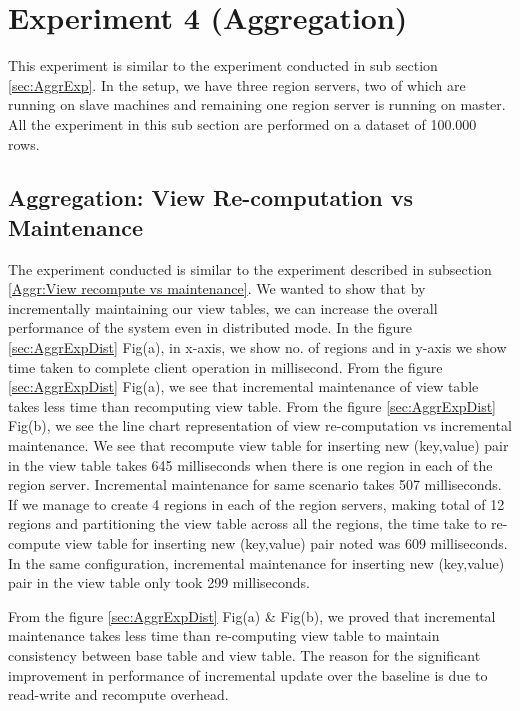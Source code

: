 \documentclass[11pt,a4paper,bibtotoc,idxtotoc,headsepline,footsepline,footexclude,BCOR12mm,DIV13]{scrbook}
\begin{document}
\section{Experiment 4 (Aggregation)}
\label{(sec:AggrExpDist)}

This experiment is similar to the experiment conducted in sub section \ref{sec:AggrExp}. In the setup, we have three region servers, two of which are running on slave machines and remaining one region server is running on master. All the experiment in this sub section are performed on a dataset of 100.000 rows.

\subsection{Aggregation: View Re-computation vs Maintenance}

The experiment conducted is similar to the experiment described in subsection \ref{Aggr:View recompute vs maintenance}. We wanted to show that by incrementally maintaining our view tables, we can increase the overall performance of the system even in distributed mode. In the figure \ref{sec:AggrExpDist} Fig(a), in x-axis, we show no. of regions and in y-axis we show time taken to complete client operation in millisecond. From the figure \ref{sec:AggrExpDist} Fig(a), we see that incremental maintenance of view table takes less time than recomputing view table. From the figure \ref{sec:AggrExpDist} Fig(b), we see the line chart representation of view re-computation vs incremental maintenance. We see that recompute view table for inserting new (key,value) pair in the view table takes 645 milliseconds when there is one region in each of the region server. Incremental maintenance for same scenario takes 507 milliseconds. If we manage to create 4 regions in each of the region servers, making total of 12 regions and partitioning the view table across all the regions, the time take to re-compute view table for inserting new (key,value) pair noted was 609 milliseconds. In the same configuration, incremental maintenance for inserting new (key,value) pair in the view table only took 299 milliseconds. 

From the figure \ref{sec:AggrExpDist} Fig(a) \& Fig(b), we proved that incremental maintenance takes less time than re-computing view table to maintain consistency between base table and view table. The reason for the significant improvement in performance of incremental update over the baseline is due to read-write and recompute overhead.
\end{document}
